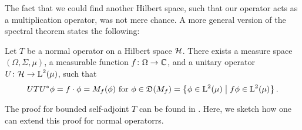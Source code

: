 The fact that we could find another Hilbert space, such that our operator
acts as a multiplication operator, was not mere chance. A more general 
version of the spectral theorem states the following:

\begin{thrm}
\label{uspecmult}
Let $T$ be a normal operator on a Hilbert space $\mathcal{H}$. There exists
a measure space $(\Omega, \Sigma, \mu)$, a measurable function 
$f\colon \Omega \to \mathbb{C}$, and a unitary operator $U\colon \mathcal{H} \to \text{L}^2(\mu)$,
such that
\[
UTU^{*} \phi = f \cdot \phi = M_f(\phi) \text{ for }\phi \in \mathfrak{D}(M_f) 
 = \left\lbrace \phi \in \text{L}^2(\mu) \bigm | f\phi \in \text{L}^2(\mu) \right\rbrace.
\]
\end{thrm}
The proof for bounded self-adjoint $T$ can be found in \cite[Ch. VII.1]{WernerFunkAna}.
Here, we sketch how one can extend this proof for normal operatorrs.

